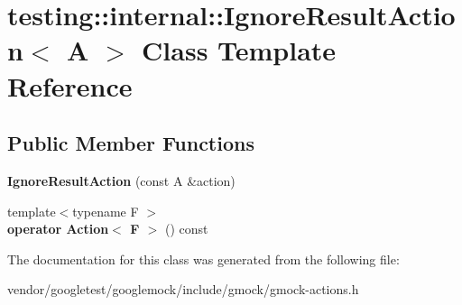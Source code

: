 \hypertarget{classtesting_1_1internal_1_1IgnoreResultAction}{}\section{testing\+:\+:internal\+:\+:Ignore\+Result\+Action$<$ A $>$ Class Template Reference}
\label{classtesting_1_1internal_1_1IgnoreResultAction}
\subsection*{Public Member Functions}
\begin{DoxyCompactItemize}
\item 
{\bfseries Ignore\+Result\+Action} (const A \&action)\hypertarget{classtesting_1_1internal_1_1IgnoreResultAction_a9199f7b1b7771b2e2a5fd28caf624623}{}\label{classtesting_1_1internal_1_1IgnoreResultAction_a9199f7b1b7771b2e2a5fd28caf624623}

\item 
{\footnotesize template$<$typename F $>$ }\\{\bfseries operator Action$<$ F $>$} () const \hypertarget{classtesting_1_1internal_1_1IgnoreResultAction_a95b6a067a3b2fa43ab229b695f5cb4d2}{}\label{classtesting_1_1internal_1_1IgnoreResultAction_a95b6a067a3b2fa43ab229b695f5cb4d2}

\end{DoxyCompactItemize}


The documentation for this class was generated from the following file\+:\begin{DoxyCompactItemize}
\item 
vendor/googletest/googlemock/include/gmock/gmock-\/actions.\+h\end{DoxyCompactItemize}
